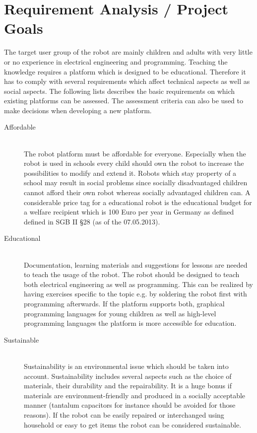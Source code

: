 \documentclass[11pt,a4paper]{article}
\begin{document}
\section{Requirement Analysis / Project Goals}
The target user group of the robot are mainly children and adults with very little or no experience in electrical engineering and programming. Teaching the knowledge requires a platform which is designed to be educational. Therefore it has to comply with several requirements which affect technical aspects as well as social aspects.
The following lists describes the basic requirements on which existing platforms can be assessed. The assessment criteria can also be used to make decisions when developing a new platform.
\begin{description}
\item[Affordable] \hfill \\ The robot platform must be affordable for everyone. Especially when the robot is used in schools every child should own the robot to increase the possibilities to modify and extend it. Robots which stay property of a school may result in social problems since socially disadvantaged children cannot afford their own robot whereas socially advantaged children can. A considerable price tag for a educational robot is the educational budget for a welfare recipient which is 100 Euro per year in Germany as defined defined in SGB II §28 (as of the 07.05.2013).
\item[Educational] \hfill \\ Documentation, learning materials and suggestions for lessons are needed to teach the usage of the robot. The robot should be designed to teach both electrical engineering as well as programming. This can be realized by having exercises specific to the topic e.g. by soldering the robot first with programming afterwards. If the platform supports both, graphical programming languages for young children as well as high-level programming languages the platform is more accessible for education. 
\item[Sustainable] \hfill \\ Sustainability is an environmental issue which should be taken into account. Sustainability includes several aspects such as the choice of materials, their durability and the repairability. It is a huge bonus if materials are environment-friendly and produced in a socially acceptable manner (tantalum capacitors for instance should be avoided for those reasons). If the robot can be easily repaired or interchanged using household or easy to get items the robot can be considered sustainable. 

\end{description}
\end{document}
